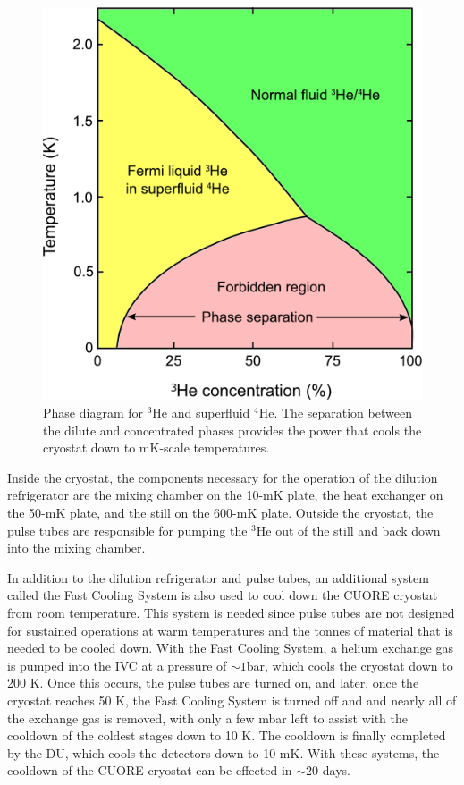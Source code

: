 \begin{figure}[htbp]
    \centering
    \includegraphics[width=0.5\linewidth]{Figures/Helium_phase_diagram.pdf}
    \caption[Phase diagram for $^{3}$He and superfluid $^{4}$He]
    {Phase diagram for $^{3}$He and superfluid $^{4}$He.
    The separation between the dilute and concentrated phases provides the power that cools the cryostat down to mK-scale temperatures.}
    \label{fig:He_phase_diagram}
\end{figure}

Inside the cryostat, the components necessary for the operation of the dilution refrigerator are the mixing chamber on the 10-mK plate, the heat exchanger on the 50-mK plate, and the still on the 600-mK plate.
Outside the cryostat, the pulse tubes are responsible for pumping the $^3$He out of the still and back down into the mixing chamber.

In addition to the dilution refrigerator and pulse tubes, an additional system called the Fast Cooling System is also used to cool down the CUORE cryostat from room temperature.
This system is needed since pulse tubes are not designed for sustained operations at warm temperatures and the tonnes of material that is needed to be cooled down.
With the Fast Cooling System, a helium exchange gas is pumped into the IVC at a pressure of $\sim1$bar, which cools the cryostat down to 200 K.
Once this occurs, the pulse tubes are turned on, and later, once the cryostat reaches 50 K, the Fast Cooling System is turned off and and nearly all of the exchange gas is removed, with only a few mbar left to assist with the cooldown of the coldest stages down to 10 K.
The cooldown is finally completed by the DU, which cools the detectors down to 10 mK.
With these systems, the cooldown of the CUORE cryostat can be effected in $\sim20$ days.

